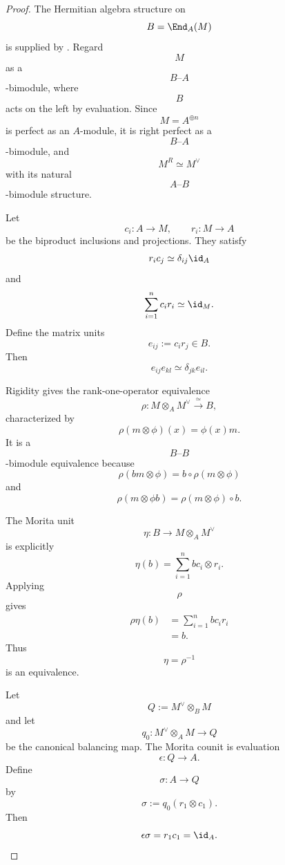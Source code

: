 \begin{proof}
The Hermitian algebra structure on
\[
    B
    =
    \End_A(M)
\]
is supplied by
.
Regard
\[
    M
\]
as a
\[
    B\text{--}A
\]
-bimodule, where
\[
    B
\]
acts on the left by evaluation. Since
\[
    M
    =
    A^{\oplus n}
\]
is perfect as an $A$-module, it is right perfect as a
\[
    B\text{--}A
\]
-bimodule, and
\[
    M^R
    \simeq
    M^\vee
\]
with its natural
\[
    A\text{--}B
\]
-bimodule structure.

Let
\[
    c_i
    \colon
    A
    \longrightarrow
    M,
    \qquad
    r_i
    \colon
    M
    \longrightarrow
    A
\]
be the biproduct inclusions and projections. They satisfy
\[
    r_ic_j
    \simeq
    \delta_{ij}\id_A
\]
and
\[
    \sum_{i=1}^n c_ir_i
    \simeq
    \id_M.
\]
Define the matrix units
\[
    e_{ij}
    :=
    c_ir_j
    \in
    B.
\]
Then
\[
    e_{ij}e_{kl}
    \simeq
    \delta_{jk}e_{il}.
\]

Rigidity gives the rank-one-operator equivalence
\[
    \rho
    \colon
    M\otimes_AM^\vee
    \xrightarrow{\;\simeq\;}
    B,
\]
characterized by
\[
    \rho(m\otimes\phi)(x)
    =
    \phi(x)m.
\]
It is a
\[
    B\text{--}B
\]
-bimodule equivalence because
\[
    \rho(bm\otimes\phi)
    =
    b\circ\rho(m\otimes\phi)
\]
and
\[
    \rho(m\otimes\phi b)
    =
    \rho(m\otimes\phi)\circ b.
\]

The Morita unit
\[
    \eta
    \colon
    B
    \longrightarrow
    M\otimes_AM^\vee
\]
is explicitly
\[
    \eta(b)
    =
    \sum_{i=1}^n
    bc_i\otimes r_i.
\]
Applying
\[
    \rho
\]
gives
\[
\begin{aligned}
    \rho\eta(b)
    &=
    \sum_{i=1}^n
    bc_ir_i
    \\
    &=
    b.
\end{aligned}
\]
Thus
\[
    \eta
    =
    \rho^{-1}
\]
is an equivalence.

Let
\[
    Q
    :=
    M^\vee\otimes_BM
\]
and let
\[
    q_0
    \colon
    M^\vee\otimes_AM
    \longrightarrow
    Q
\]
be the canonical balancing map. The Morita counit is evaluation
\[
    \epsilon
    \colon
    Q
    \longrightarrow
    A.
\]
Define
\[
    \sigma
    \colon
    A
    \longrightarrow
    Q
\]
by
\[
    \sigma
    :=
    q_0(r_1\otimes c_1).
\]
Then
\[
    \epsilon\sigma
    =
    r_1c_1
    =
    \id_A.
\]


\end{proof}
